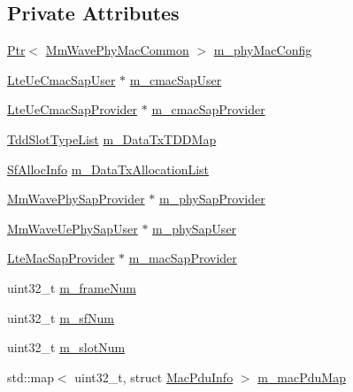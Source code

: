 \subsection*{Private Attributes}
\begin{DoxyCompactItemize}
\item 
\hyperlink{classns3_1_1Ptr}{Ptr}$<$ \hyperlink{classns3_1_1MmWavePhyMacCommon}{Mm\+Wave\+Phy\+Mac\+Common} $>$ \hyperlink{classns3_1_1MmWaveUeMac_a24c07c6453f442e2e818803190371a46}{m\+\_\+phy\+Mac\+Config}
\item 
\hyperlink{classns3_1_1LteUeCmacSapUser}{Lte\+Ue\+Cmac\+Sap\+User} $\ast$ \hyperlink{classns3_1_1MmWaveUeMac_ad412658a2ce51f06e8a27dbfdf8f9cce}{m\+\_\+cmac\+Sap\+User}
\item 
\hyperlink{classns3_1_1LteUeCmacSapProvider}{Lte\+Ue\+Cmac\+Sap\+Provider} $\ast$ \hyperlink{classns3_1_1MmWaveUeMac_a9fd493faeaf5a9aa46db67a045ca845d}{m\+\_\+cmac\+Sap\+Provider}
\item 
\hyperlink{namespacens3_a74052c5410c5c8e0028017dbf985cd1f}{Tdd\+Slot\+Type\+List} \hyperlink{classns3_1_1MmWaveUeMac_a561bbfe6fd8a3ab648fd48cda26ed47c}{m\+\_\+\+Data\+Tx\+T\+D\+D\+Map}
\item 
\hyperlink{structns3_1_1SfAllocInfo}{Sf\+Alloc\+Info} \hyperlink{classns3_1_1MmWaveUeMac_aa5b0315b7504274a2833facc205da6ea}{m\+\_\+\+Data\+Tx\+Allocation\+List}
\item 
\hyperlink{classns3_1_1MmWavePhySapProvider}{Mm\+Wave\+Phy\+Sap\+Provider} $\ast$ \hyperlink{classns3_1_1MmWaveUeMac_aac9de0fee7f139e5216613369318a7ce}{m\+\_\+phy\+Sap\+Provider}
\item 
\hyperlink{classns3_1_1MmWaveUePhySapUser}{Mm\+Wave\+Ue\+Phy\+Sap\+User} $\ast$ \hyperlink{classns3_1_1MmWaveUeMac_a83e3cab24b0b21a1d1d14712184f5f3c}{m\+\_\+phy\+Sap\+User}
\item 
\hyperlink{classns3_1_1LteMacSapProvider}{Lte\+Mac\+Sap\+Provider} $\ast$ \hyperlink{classns3_1_1MmWaveUeMac_afbe03b72eaa2bfde8e0c3ce6a894c590}{m\+\_\+mac\+Sap\+Provider}
\item 
uint32\+\_\+t \hyperlink{classns3_1_1MmWaveUeMac_aff3b4a35e6f83bd3762e0d1187475717}{m\+\_\+frame\+Num}
\item 
uint32\+\_\+t \hyperlink{classns3_1_1MmWaveUeMac_a6502efe66b636fe976c308a9edac3627}{m\+\_\+sf\+Num}
\item 
uint32\+\_\+t \hyperlink{classns3_1_1MmWaveUeMac_a702f7af1a81e2cffc2a1b4713a42cc09}{m\+\_\+slot\+Num}
\item 
std\+::map$<$ uint32\+\_\+t, struct \hyperlink{structns3_1_1MacPduInfo}{Mac\+Pdu\+Info} $>$ \hyperlink{classns3_1_1MmWaveUeMac_a09a4dbc07dea88a700daf9ae82588768}{m\+\_\+mac\+Pdu\+Map}

\end{DoxyCompactItemize}
